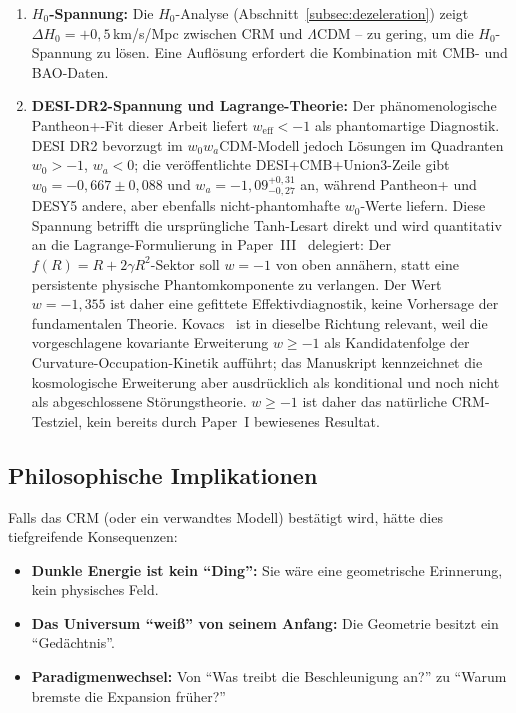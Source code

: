 \documentclass[aps,prd,twocolumn,superscriptaddress,nofootinbib]{revtex4-2}
\begin{document}
\begin{enumerate}
\item \textbf{$H_0$-Spannung:} Die $H_0$-Analyse (Abschnitt~\ref{subsec:dezeleration}) zeigt $\Delta H_0 = +0{,}5\,$km/s/Mpc zwischen CRM und $\Lambda$CDM -- zu gering, um die $H_0$-Spannung zu l\"osen. Eine Aufl\"osung erfordert die Kombination mit CMB- und BAO-Daten.
\item \textbf{DESI-DR2-Spannung und Lagrange-Theorie:} Der phänomenologische Pantheon+-Fit dieser Arbeit liefert $w_{\mathrm{eff}}< -1$ als phantomartige Diagnostik. DESI DR2 \cite{DESI2025} bevorzugt im $w_0w_a$CDM-Modell jedoch Lösungen im Quadranten $w_0>-1$, $w_a<0$; die veröffentlichte DESI+CMB+Union3-Zeile gibt $w_0=-0{,}667\pm0{,}088$ und $w_a=-1{,}09^{+0{,}31}_{-0{,}27}$ an, während Pantheon+ und DESY5 andere, aber ebenfalls nicht-phantomhafte $w_0$-Werte liefern. Diese Spannung betrifft die ursprüngliche Tanh-Lesart direkt und wird quantitativ an die Lagrange-Formulierung in Paper~III~\cite{Geiger2026c} delegiert: Der $f(R)=R+2\gamma R^2$-Sektor soll $w=-1$ von oben annähern, statt eine persistente physische Phantomkomponente zu verlangen. Der Wert $w=-1{,}355$ ist daher eine gefittete Effektivdiagnostik, keine Vorhersage der fundamentalen Theorie. Kovacs~\cite{Kovacs2026} ist in dieselbe Richtung relevant, weil die vorgeschlagene kovariante Erweiterung $w\geq -1$ als Kandidatenfolge der Curvature-Occupation-Kinetik aufführt; das Manuskript kennzeichnet die kosmologische Erweiterung aber ausdrücklich als konditional und noch nicht als abgeschlossene Störungstheorie. $w\geq -1$ ist daher das natürliche CRM-Testziel, kein bereits durch Paper~I bewiesenes Resultat.
\end{enumerate}

\subsection{Philosophische Implikationen}

Falls das CRM (oder ein verwandtes Modell) best\"atigt wird, h\"atte dies tiefgreifende Konsequenzen:

\begin{itemize}
\item \textbf{Dunkle Energie ist kein ``Ding'':} Sie w\"are eine geometrische Erinnerung, kein physisches Feld.
\item \textbf{Das Universum ``wei\ss{}'' von seinem Anfang:} Die Geometrie besitzt ein ``Ged\"achtnis''.
\item \textbf{Paradigmenwechsel:} Von ``Was treibt die Beschleunigung an?'' zu ``Warum bremste die Expansion fr\"uher?''
\end{itemize}
\end{document}
